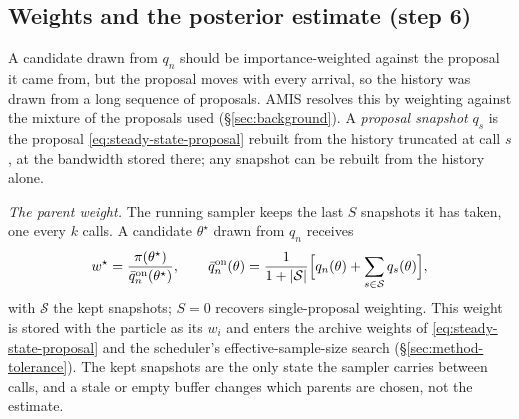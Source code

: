 \documentclass[10pt]{article}
\theoremstyle{plain}
\theoremstyle{definition}
\begin{document}
\subsection{Weights and the posterior estimate (step 6)}\label{sec:method-weights}\label{sec:method-amis}\label{sec:method-estimate}
A candidate drawn from $q_n$ should be importance-weighted against the proposal it came from, but the proposal moves with every arrival, so the history was drawn from a long sequence of proposals. AMIS resolves this by weighting against the mixture of the proposals used (\S\ref{sec:background}). A \emph{proposal snapshot} $q_s$ is the proposal \eqref{eq:steady-state-proposal} rebuilt from the history truncated at call $s$, at the bandwidth stored there; any snapshot can be rebuilt from the history alone.

\emph{The parent weight.} The running sampler keeps the last $S$ snapshots it has taken, one every $k$ calls. A candidate $\theta^\star$ drawn from $q_n$ receives
\begin{equation}
w^\star = \frac{\pi(\theta^\star)}{\bar q^{\mathrm{on}}_n(\theta^\star)},
\qquad
\bar q^{\mathrm{on}}_n(\theta) = \frac{1}{1+|\mathcal{S}|}\Bigl[q_n(\theta) + \sum_{s\in\mathcal{S}} q_s(\theta)\Bigr],
\label{eq:amis-weight}
\end{equation}
with $\mathcal{S}$ the kept snapshots; $S=0$ recovers single-proposal weighting. This weight is stored with the particle as its $w_i$ and enters the archive weights of \eqref{eq:steady-state-proposal} and the scheduler's effective-sample-size search (\S\ref{sec:method-tolerance}). The kept snapshots are the only state the sampler carries between calls, and a stale or empty buffer changes which parents are chosen, not the estimate.
\end{document}
